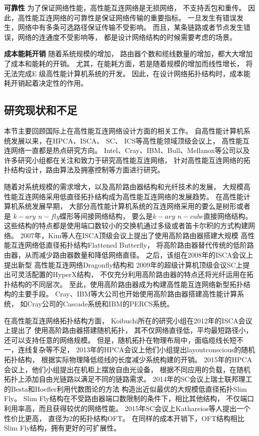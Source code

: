 \textbf{可靠性} 为了保证网络性能，高性能互连网络是无损网络，
不支持丢包和重传。
因此，高性能互连网络的可靠性是保证网络传输的重要指标。
一旦发生有错误发生，网络中有多条可选路径保证传输不受影响。
而且，某条链路或者节点发生错误，网络的连通度不受影响等，
都是设计网络结构的时候需要考虑的场景。

\textbf{成本能耗开销} 随着系统规模的增加，
路由器个数和缆线数量的增加，都大大增加了成本和能耗的开销。
尤其，在能耗方面，若是随着规模的增加而线性增长，
将无法完成E 级高性能计算机系统的开发。
因此，在设计网络拓扑结构时，成本能耗开销起着决定性的作用。

\subsection{研究现状和不足}

本节主要回顾国际上在高性能互连网络设计方面的相关工作。
自高性能计算机系统发展以来，在HPCA、ISCA、 SC、 ICS等高性能领域顶级会议上，
高性能互连网络一直都是热点研究方向。
Intel、Cray、IBM、Bull、Mellanox等公司以及
许多研究小组都在关注和致力于研究高性能互连网络，
针对高性能互连网络的拓扑结构设计，路由算法及拥塞控制等方面进行研究。

随着对系统规模的需求增大，以及高阶路由器结构和光纤技术的发展，
大规模高性能互连网络采用低直径拓扑结构成为高性能互连网络的发展趋势。
在高性能计算机系统发展早期，
大部分高性能计算机系统的互连网络采用的要么是树形或者是
$k-ary$ $n-fly$蝶形等间接网络结构，
要么是$k-ary$ $n-cube$直接网络结构。
这些结构的特点都是使用端口数较小的交换机通过多级或者笛卡尔积的方式构建网络。
2007年，Kim等人在ISCA顶级会议上提出了使用高阶路由器搭建大规模
高性能互连网络低直径拓扑结构Flattened Butterfly，
将高阶路由器替代传统的低阶路由器，从而减少路由器数量和降低网络直径。
之后，该组在2008年的ISCA会议上提出新型
高性能互连网络Dragonfly结构和
2009年的超级计算机顶级会议SC上提出可灵活配置的HyperX结构，
不仅充分利用高阶路由器的特点还将光纤运用在拓扑结构的不同层次。
至此，使用高阶路由器成为构建高性能互连网络新型拓扑结构的主要手段。
Cray、IBM等大公司也开始使用高阶路由器搭建高性能计算系统，
如Cray公司的Cascade系统和IBM的PERCS系统。

在高性能互连网络拓扑结构方面，
Koibuchi所在的研究小组在2012年的ISCA会议上提出了
使用高阶路由器搭建随机拓扑，
其不仅网络直径低，平均最短路径小，还可以支持任意的网络规模。
但是，随机拓扑在物理布局中，面临缆线长短不一，连线复杂等不足，
2013年的HPCA会议上他们小组提出layout\-conscious的随机拓扑结构，
根据实际物理降低缆线的长度减少系统构建的开销。
2015年的HPCA 会议上，他们小组提出在机柜上摆放自由光设备，
根据不同应用的负载，在随机拓扑上添加自由光链路以满足不同的链路需求。
2014年的SC会议上瑞士联邦理工的Besta和Hoefler利用代数图论的方法
构造出近似最优的大规模低直径拓扑Slim Fly。
Slim Fly结构在不受路由器端口数限制的条件下，相比其他结构，
不仅端口利用率高，而且获得较优的网络性能。
2015年SC会议上Kathareios等人提出一个性价比更高，
直径为2的拓扑结构OFT。
在同样的成本开销下，OFT结构相比Slim Fly结构，拥有更好的可扩展性。

